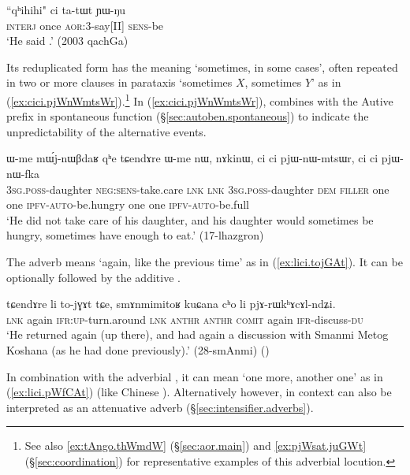 \begin{exe}
\ex \label{ex:qhihihi.ci}
\gll ``qʰihihi" ci ta-tɯt ɲɯ-ŋu  \\
\textsc{interj} once \textsc{aor}:3\flobv{}-say[II] \textsc{sens}-be \\
\glt `He said .' (2003 qachGa)
\end{exe}

Its reduplicated form  has the meaning `sometimes, in some cases', often repeated in two or more clauses in parataxis `sometimes $X$, sometimes $Y$'  as in (\ref{ex:cici.pjWnWmtsWr}).\footnote{See also \ref{ex:tAngo.thWmdW} (§\ref{sec:aor.main}) and \ref{ex:pjWsat.juGWt} (§\ref{sec:coordination}) for representative examples of this adverbial locution. }  In  (\ref{ex:cici.pjWnWmtsWr}),  combines with the Autive prefix in spontaneous function (§\ref{sec:autoben.spontaneous}) to indicate the unpredictability of the alternative events.
 
\begin{exe}
\ex \label{ex:cici.pjWnWmtsWr}
\gll  ɯ-me mɯ́j-nɯβdaʁ qʰe tɕendɤre ɯ-me nɯ, nɤkinɯ, ci ci pjɯ-nɯ-mtsɯr, ci ci pjɯ-nɯ-fka  \\
 \textsc{3sg}.\textsc{poss}-daughter \textsc{neg}:\textsc{sens}-take.care \textsc{lnk} \textsc{lnk}  \textsc{3sg}.\textsc{poss}-daughter \textsc{dem} \textsc{filler} one one \textsc{ipfv}-\textsc{auto}-be.hungry one one \textsc{ipfv}-\textsc{auto}-be.full \\
 \glt  `He did not take care of his daughter, and his daughter would sometimes be hungry, sometimes have enough to eat.' (17-lhazgron)
 \end{exe}
 
 The adverb  means  `again, like the previous time' as in (\ref{ex:lici.tojGAt}). It can be optionally followed by the additive .
 
\begin{exe}
\ex \label{ex:lici.tojGAt}
\gll tɕendɤre li to-jɣɤt tɕe, smɤnmimitoʁ kuɕana cʰo li pjɤ-rɯkʰɤcɤl-ndʑi.  \\
\textsc{lnk} again \textsc{ifr}:\textsc{up}-turn.around \textsc{lnk}  \textsc{anthr} \textsc{anthr} \textsc{comit} again \textsc{ifr}-discuss-\textsc{du} \\
\glt `He returned again (up there), and had again a discussion with Smanmi Metog Koshana (as he had done previously).' (28-smAnmi)
()
 \end{exe}

In combination with the adverbial , it can mean `one more, another one' as in (\ref{ex:lici.pWfCAt}) (like Chinese ). Alternatively however,  in context can also be interpreted as an attenuative adverb (§\ref{sec:intensifier.adverbs}).
 
